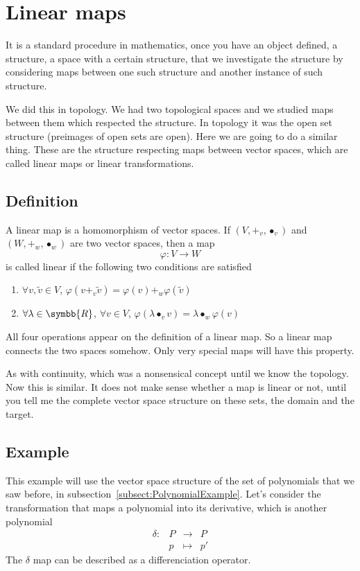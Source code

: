 \section{Linear maps}
It is a standard procedure in mathematics, once you have an object defined, a structure,
a space with a certain structure, that we investigate the structure by considering maps between
one such structure and another instance of such structure.

We did this in topology. We had two topological spaces and we studied maps between them which
respected the structure. In topology it was the open set structure (preimages of open sets are
open). Here we are going to do a similar thing. These are the structure respecting maps between
vector spaces, which are called linear maps or linear transformations.

\subsection{Definition}
A linear map is a homomorphism of vector spaces.
If $(V,+_v,\vysmblkcircle_v)$ and $(W,+_w,\vysmblkcircle_w)$ are two vector spaces, then a map
\[
  \varphi: V \longrightarrow W
\]
is called linear if the following two conditions are satisfied
\begin{enumerate}
\item $\forall v,\tilde v\in V$,\hspace{.5em}
  $\varphi(v +_v \tilde v) = \varphi(v) +_w \varphi(\tilde v)$
\item $\forall\lambda\in\symbb{R}$, $\forall v\in V$,\hspace{.5em}
  $\varphi(\lambda\vysmblkcircle_v v) = \lambda\vysmblkcircle_w \varphi(v)$
\end{enumerate}
All four operations appear on the definition of a linear map. So a linear map connects the two
spaces somehow. Only very special maps will have this property.

As with continuity, which was a nonsensical concept until we know the topology.
Now this is similar. It does not make sense whether a map is linear or not, until you tell me
the complete vector space structure on these sets, the domain and the target.

\subsection{Example}
This example will use the vector space structure of the set of polynomials that we saw before, in
subsection~\ref{subsect:PolynomialExample}.
Let's consider the transformation that maps a polynomial into its derivative, which is another
polynomial
\[
  \begin{array}{lccc}
    \delta : & P & \longrightarrow & P\\
             & p & \mapsto & p'
  \end{array}
\]
The $\delta$ map can be described as a differenciation operator.

